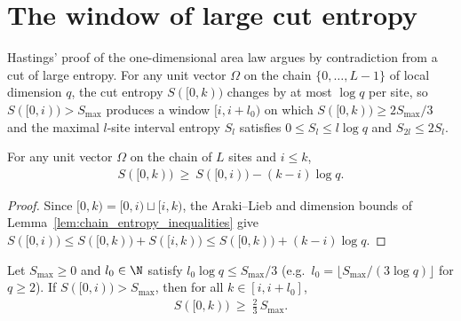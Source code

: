\section{The window of large cut entropy}
\label{sec:hastings_window}

Hastings' proof of the one-dimensional area law \cite{Hastings2007AreaLaw}
argues by contradiction from a cut of large entropy. For any unit vector
$\Omega$ on the chain $\{0,\ldots,L-1\}$ of local dimension $q$, the cut
entropy $S(\lbrack 0,k))$ changes by at most $\log q$ per site, so
$S(\lbrack 0,i))>S_{\max}$ produces a window $[i,i+l_0)$ on which
$S(\lbrack 0,k))\ge 2S_{\max}/3$ and the maximal $l$-site interval entropy
$S_l$ satisfies $0\le S_l\le l\log q$ and $S_{2l}\le 2S_l$.

\begin{lemma}
    \label{thm:hastings_cut_entropy_slow}
    \leanok
    For any unit vector $\Omega$ on the chain of $L$ sites and $i\le k$,
    \begin{align}
        S(\lbrack 0,k))\ \ge\ S(\lbrack 0,i))-(k-i)\log q .
        \label{eq:hastings_cut_entropy_slow}
    \end{align}
\end{lemma}

\begin{proof}
    \leanok
    Since $\lbrack 0,k)=\lbrack 0,i)\sqcup\lbrack i,k)$, the Araki--Lieb and
    dimension bounds of Lemma~\ref{lem:chain_entropy_inequalities} give
    $S(\lbrack 0,i))\le S(\lbrack 0,k))+S(\lbrack i,k))\le S(\lbrack 0,k))+(k-i)\log q$.
\end{proof}

\begin{lemma}
    \label{thm:hastings_window_cut_entropy}
    \leanok
    Let $S_{\max}\ge 0$ and $l_0\in\N$ satisfy $l_0\log q\le S_{\max}/3$ (e.g.\
    $l_0=\lfloor S_{\max}/(3\log q)\rfloor$ for $q\ge 2$). If
    $S(\lbrack 0,i))>S_{\max}$, then for all $k\in[i,i+l_0]$,
    \begin{align}
        S(\lbrack 0,k))\ \ge\ \tfrac23\, S_{\max}.
        \label{eq:hastings_window_cut_entropy}
    \end{align}
\end{lemma}

